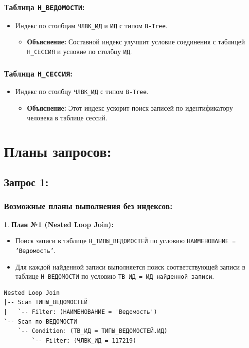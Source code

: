 \documentclass[14pt]{extreport}
\begin{document}
            \subsection*{Таблица \texttt{Н\_ВЕДОМОСТИ}:}
                \begin{itemize}
                    \item Индекс по столбцам \texttt{ЧЛВК\_ИД} и \texttt{ИД} с типом \texttt{B-Tree}.
                    \begin{itemize}
                        \item \textbf{Объяснение:} Составной индекс улучшит условие соединения с таблицей \texttt{Н\_СЕССИЯ} и условие по столбцу \texttt{ИД}.
                    \end{itemize}
                \end{itemize}

            \subsection*{Таблица \texttt{Н\_СЕССИЯ}:}
                \begin{itemize}
                    \item Индекс по столбцу \texttt{ЧЛВК\_ИД} с типом \texttt{B-Tree}.
                    \begin{itemize}
                        \item \textbf{Объяснение:} Этот индекс ускорит поиск записей по идентификатору человека в таблице сессий.
                    \end{itemize}
                \end{itemize}

\chapter{Планы запросов:}
        \section*{Запрос 1:}

            \subsection*{Возможные планы выполнения без индексов:}

                1. \textbf{План №1 (Nested Loop Join):}
                \begin{itemize}
                    \item Поиск записи в таблице \texttt{Н\_ТИПЫ\_ВЕДОМОСТЕЙ} по условию \texttt{НАИМЕНОВАНИЕ = 'Ведомость'}.
                    \item Для каждой найденной записи выполняется поиск соответствующей записи в таблице \texttt{Н\_ВЕДОМОСТИ} по условию \texttt{ТВ\_ИД = ИД найденной записи}.
                \end{itemize}
                \begin{verbatim}
Nested Loop Join
|-- Scan ТИПЫ_ВЕДОМОСТЕЙ
|   `-- Filter: (НАИМЕНОВАНИЕ = 'Ведомость')
`-- Scan по ВЕДОМОСТИ
    `-- Condition: (ТВ_ИД = ТИПЫ_ВЕДОМОСТЕЙ.ИД)
        `-- Filter: (ЧЛВК_ИД = 117219)
                \end{verbatim}
\end{document}

